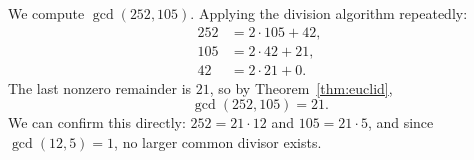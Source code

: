 \begin{example}
We compute $\gcd(252, 105)$. Applying the division algorithm repeatedly:
\begin{align*}
252 &= 2 \cdot 105 + 42, \\
105 &= 2 \cdot 42 + 21, \\
42  &= 2 \cdot 21 + 0.
\end{align*}
The last nonzero remainder is $21$, so by Theorem~\ref{thm:euclid},
\[
\gcd(252, 105) = 21.
\]
We can confirm this directly: $252 = 21 \cdot 12$ and $105 = 21 \cdot 5$, and since $\gcd(12, 5) = 1$, no larger common divisor exists.
\end{example}
